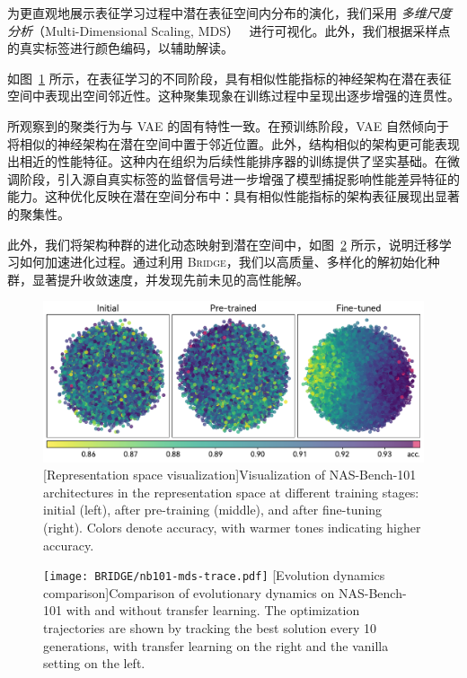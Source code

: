 \documentclass[../main.tex]{subfiles}
\begin{document}
\label{sec:ch4-9-1-latent-embedding-space-observation}

为更直观地展示表征学习过程中潜在表征空间内分布的演化，我们采用 \textit{多维尺度分析}（Multi-Dimensional Scaling, MDS）~\cite{chapter3multidimensional_douglascarroll_1998} 进行可视化。此外，我们根据采样点的真实标签进行颜色编码，以辅助解读。

如图~\ref{fig:nb101-mds} 所示，在表征学习的不同阶段，具有相似性能指标的神经架构在潜在表征空间中表现出空间邻近性。这种聚集现象在训练过程中呈现出逐步增强的连贯性。

所观察到的聚类行为与 VAE 的固有特性一致。在预训练阶段，VAE 自然倾向于将相似的神经架构在潜在空间中置于邻近位置。此外，结构相似的架构更可能表现出相近的性能特征。这种内在组织为后续性能排序器的训练提供了坚实基础。在微调阶段，引入源自真实标签的监督信号进一步增强了模型捕捉影响性能差异特征的能力。这种优化反映在潜在空间分布中：具有相似性能指标的架构表征展现出显著的聚集性。

此外，我们将架构种群的进化动态映射到潜在空间中，如图~\ref{fig:nb101-mds-trace} 所示，说明迁移学习如何加速进化过程。通过利用 \textsc{Bridge}，我们以高质量、多样化的解初始化种群，显著提升收敛速度，并发现先前未见的高性能解。

\begin{figure}[htbp]
	\centering
	\includegraphics[width=.7\linewidth]{BRIDGE/nb101-mds.pdf}
	[Representation space visualization]{Visualization of NAS-Bench-101 architectures in the representation space at different training stages: initial (left), after pre-training (middle), and after fine-tuning (right). Colors denote accuracy, with warmer tones indicating higher accuracy.}\label{fig:nb101-mds}
\end{figure}

\begin{figure}[htbp]
	\centering
	\texttt{[image: BRIDGE/nb101-mds-trace.pdf]}
	[Evolution dynamics comparison]{Comparison of evolutionary dynamics on NAS-Bench-101 with and without transfer learning. The optimization trajectories are shown by tracking the best solution every 10 generations, with transfer learning on the right and the vanilla setting on the left.}\label{fig:nb101-mds-trace}
\end{figure}
\end{document}
